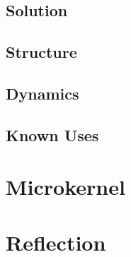 \documentclass{scrbook}
\begin{document}
\section{Solution}

\section{Structure}

\section{Dynamics}

\section{Known Uses}



\chapter{Microkernel}
\chapter{Reflection}
\end{document}

